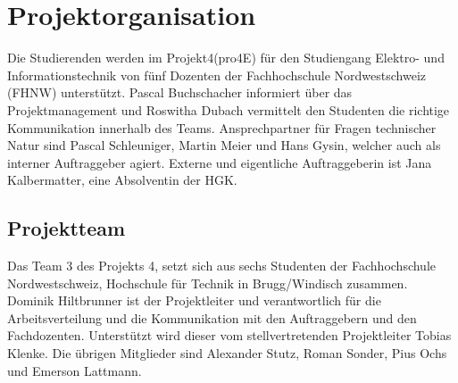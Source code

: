 \documentclass[10pt,a4paper,oneside]{99_fhnwreport}
\begin{document}
\section{Projektorganisation}\label{sec:projektorganisation}

Die Studierenden werden im Projekt4(pro4E) für den Studiengang Elektro- und Informationstechnik von fünf Dozenten der Fachhochschule Nordwestschweiz (FHNW) unterstützt. Pascal Buchschacher informiert über das Projektmanagement und Roswitha Dubach vermittelt den Studenten die richtige Kommunikation innerhalb des Teams. Ansprechpartner für Fragen technischer Natur sind Pascal Schleuniger, Martin Meier und Hans Gysin, welcher auch als interner Auftraggeber agiert.
Externe und eigentliche Auftraggeberin ist Jana Kalbermatter, eine Absolventin der HGK.

\subsection{Projektteam}\label{subsec:projektteam}
Das Team 3 des Projekts 4, setzt sich aus sechs Studenten der Fachhochschule Nordwestschweiz, Hochschule für Technik in Brugg/Windisch zusammen. Dominik Hiltbrunner ist der Projektleiter und verantwortlich für die Arbeitsverteilung und die Kommunikation mit den Auftraggebern und den Fachdozenten. Unterstützt wird dieser vom stellvertretenden Projektleiter Tobias Klenke. Die übrigen Mitglieder sind Alexander Stutz, Roman Sonder, Pius Ochs und Emerson Lattmann. 
\newpage
\end{document}
